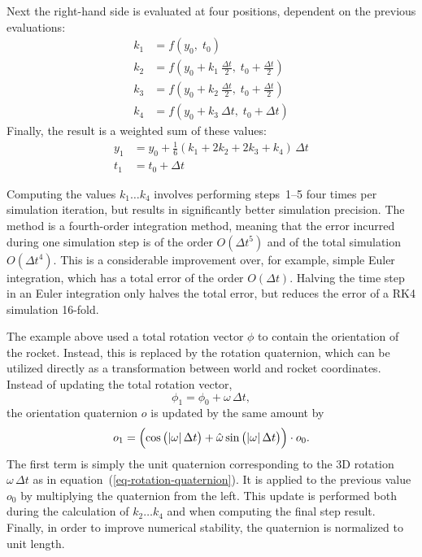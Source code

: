 Next the right-hand side is evaluated at four positions, dependent on
the previous evaluations:
%
\begin{equation}
\begin{split}
k_1 &= f(y_0,\; t_0) \\
k_2 &= f(y_0 + k_1\:\mbox{$\frac{\Delta t}{2}$},\; 
       t_0 + \mbox{$\frac{\Delta t}{2}$}) \\
k_3 &= f(y_0 + k_2\:\mbox{$\frac{\Delta t}{2}$},\; 
       t_0 + \mbox{$\frac{\Delta t}{2}$}) \\
k_4 &= f(y_0 + k_3\:\Delta t,\; t_0 + \Delta t)
\end{split}
\end{equation}
%
Finally, the result is a weighted sum of these values:
%
\begin{align}
y_1 &= y_0 + \frac{1}{6}\left(k_1+2k_2+2k_3+k_4\right)\,\Delta t \\
t_1 &= t_0 + \Delta t
\end{align}

Computing the values $k_1\ldots k_4$ involves performing steps~1--5
four times per simulation iteration, but results in significantly
better simulation precision.  The method is a fourth-order integration
method, meaning that the error incurred during one simulation step is
of the order  $O(\Delta t^5)$ and of the total simulation 
$O(\Delta t^4)$.  This is a considerable improvement
over, for example, simple Euler integration, which has a total error
of the order $O(\Delta t)$.  Halving the time step in an Euler
integration only halves the total error, but reduces the error of a
RK4 simulation 16-fold.

The example above used a total rotation vector $\phi$ to contain the
orientation of the rocket.  Instead, this is replaced by the rotation
quaternion, which can be utilized directly as a transformation between
world and rocket coordinates.  Instead of updating the total rotation
vector,
%
\begin{equation}
\phi_1 = \phi_0 + \omega\,\Delta t,
\end{equation}
%
the orientation quaternion $o$ is updated by the same amount by
%
\begin{equation}
o_1 = \del{\cos\del{|\omega|\,\Delta t} +
\hat\omega\sin\del{|\omega|\,\Delta t}} \cdot o_0.
\end{equation}
%
The first term is simply the unit quaternion corresponding to the
3D rotation $\omega\,\Delta t$ as in
equation~(\ref{eq-rotation-quaternion}).  It is applied to the
previous value $o_0$ by multiplying the quaternion from the left.
This update is performed both during the calculation of 
$k_2\ldots k_4$ and when computing the final step result.  Finally, in
order to improve numerical stability, the quaternion is normalized to
unit length.

